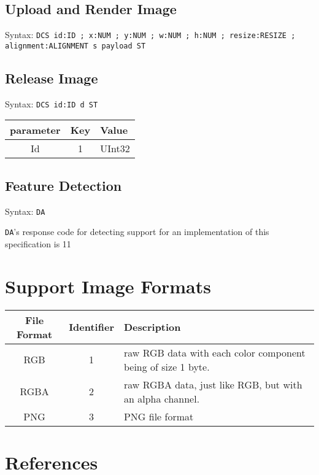 \documentclass{article}
\newcommand{\code}[1]{\colorbox{light-gray}{\texttt{#1}}}
\newcommand{\DA}{\code{DA}}
\begin{document}
\subsection{Upload and Render Image}

Syntax: \code{DCS id:ID ; x:NUM ; y:NUM ; w:NUM ; h:NUM ; resize:RESIZE ; alignment:ALIGNMENT s payload ST}

\subsection{Release Image}

Syntax: \code{DCS id:ID d ST}

\begin{tabular}{ |c|c|l| }
    \hline
    parameter   & Key & Value \\
    \hline
    Id          & 1   & UInt32 \\
    \hline
\end{tabular}

\subsection{Feature Detection}

Syntax: \DA

\DA's response code for detecting support for an implementation of this specification is 11

\section{Support Image Formats} %

\label{sec:supported-image-formtats}

\begin{tabular}{c | c | l}
    File Format & Identifier & Description \\ \hline
    RGB & 1 & raw RGB data with each color component being of size 1 byte. \\
    RGBA & 2 & raw RGBA data, just like RGB, but with an alpha channel. \\
    PNG & 3 & PNG file format \\
\end{tabular}

\section{References} %
\end{document}
